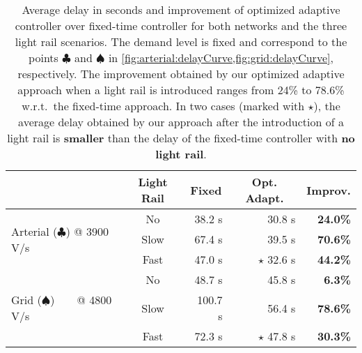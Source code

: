 \newcommand{\cellSymbol}{\ensuremath{\star}\xspace}

\begin{table}
\centering
\footnotesize
\begin{tabular}{p{16mm}|c|r|r|r}
  & \multicolumn{1}{c|}{Light Rail}
  & \multicolumn{1}{c|}{Fixed}
  & \multicolumn{1}{c|}{Opt. Adapt.}
  & \multicolumn{1}{c}{\textbf{Improv.}}
\\ \hline \hline
\multirow{3}{*}{\parbox{16mm}{Arterial ($\clubsuit$) @ 3900 V/s}}
  & No     &  38.2 s & 30.8 s    & \textbf{24.0\%}     \\
  & Slow   &  67.4 s & 39.5 s    & \textbf{70.6\%}     \\
  & Fast   &  47.0 s & \cellSymbol 32.6 s    & \textbf{44.2\%}     \\
\hline
\multirow{3}{*}{\parbox{16mm}{Grid ($\spadesuit$) ~ ~ @ 4800 V/s}}
  & No     &  48.7 s & 45.8 s    & \textbf{6.3\%}      \\
  & Slow   & 100.7 s & 56.4 s    & \textbf{78.6\%}     \\
  & Fast   &  72.3 s & \cellSymbol 47.8 s    & \textbf{30.3\%}     \\
\end{tabular}
\caption{Average delay in seconds and improvement of optimized adaptive
controller over fixed-time controller for both networks and the three light rail
scenarios.
%
The demand level is fixed and correspond to the points $\clubsuit$ and
$\spadesuit$ in \cref{fig:arterial:delayCurve,fig:grid:delayCurve},
respectively.
%
The improvement obtained by our optimized adaptive approach when a light rail is
introduced ranges from 24\% to 78.6\% w.r.t.\ the fixed-time approach.
%
In two cases (marked with \cellSymbol), the average delay obtained by
our approach after the introduction of a light rail is
\textbf{smaller} than the delay of the fixed-time controller with \textbf{no
light rail}.}
\label{fig:table}
\end{table}

